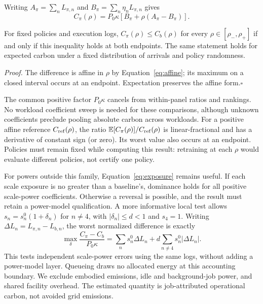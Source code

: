 Writing $A_\pi=\sum_nL_{\pi,n}$ and
$B_\pi=\sum_n\eta_nL_{\pi,n}$ gives
\begin{equation}
 C_\pi(\rho)=P_0\kappa
              [B_\pi+\rho(A_\pi-B_\pi)].
 \label{eq:affine}
\end{equation}
\begin{proposition}
\label{prop:endpoints}
For fixed policies and execution logs, $C_\pi(\rho)\leq C_b(\rho)$ for every
$\rho\in[\rho_-,\rho_+]$ if and only if this inequality holds at both
endpoints. The same statement holds for expected carbon under a fixed
distribution of arrivals and policy randomness.
\end{proposition}
\noindent\emph{Proof.}
The difference is affine in $\rho$ by Equation~\ref{eq:affine}; its maximum
on a closed interval occurs at an endpoint. Expectation preserves the affine
form.\hfill$\square$

The common positive factor $P_0\kappa$ cancels from within-panel
ratios and rankings. No workload coefficient sweep is needed for these
comparisons, although unknown coefficients preclude pooling absolute carbon
across workloads. For a positive affine reference $C_{\rm ref}(\rho)$, the
ratio $\mathbb E[C_\pi(\rho)]/C_{\rm ref}(\rho)$ is linear-fractional and
has a derivative of constant sign (or zero). Its worst value also occurs at
an endpoint. Policies must remain fixed while computing this result: retraining
at each $\rho$ would evaluate different policies, not certify one policy.

For powers outside this family, Equation~\ref{eq:exposure} remains useful.
If each scale exposure is no greater than a baseline's, dominance holds for
all positive scale-power coefficients. Otherwise a reversal is possible,
and the result must retain a power-model qualification. A more informative
local test allows $s_n=s_n^0(1+\delta_n)$ for $n\ne4$, with
$|\delta_n|\leq d<1$ and $s_4=1$. Writing
$\Delta L_n=L_{\pi,n}-L_{b,n}$, the worst normalized difference is exactly
\begin{equation}
 \max_{\delta}\frac{C_\pi-C_b}{P_0\kappa}
 =\sum_n s_n^0\Delta L_n
       +d\sum_{n\ne4}s_n^0|\Delta L_n|.
 \label{eq:box}
\end{equation}
This tests independent scale-power errors using the same logs, without
adding a power-model layer. Queueing draws no
allocated energy at this accounting boundary. We exclude embodied emissions,
idle and background-job power, and shared facility overhead. The estimated
quantity is job-attributed operational carbon, not avoided grid emissions.
